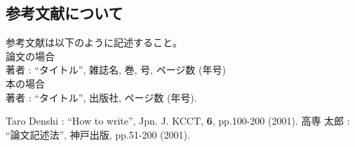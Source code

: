 \documentclass{jarticle}
\begin{document}
\subsection{参考文献について}
参考文献は以下のように記述すること。
\\
論文の場合\\
著者 : ``タイトル'', 雑誌名, 巻, 号, ページ数 (年号)\\
本の場合\\
著者 : ``タイトル'', 出版社, ページ数 (年号).\\

\begin{thebibliography}{99}%
Taro Denshi : ``How to write'', Jpn. J. KCCT,
 \textbf{6}, pp.100-200 (2001).
高専 太郎 : ``論文記述法'', 神戸出版, pp.51-200 (2001).
\end{thebibliography}
\end{document}
